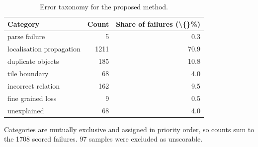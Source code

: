 \begin{table}[t]
\centering
\small
\begin{tabular}{lrr}
\toprule
Category & Count & Share of failures (\textbackslash\{\}\%) \\
\midrule
parse failure & 5 & 0.3 \\
localisation propagation & 1211 & 70.9 \\
duplicate objects & 185 & 10.8 \\
tile boundary & 68 & 4.0 \\
incorrect relation & 162 & 9.5 \\
fine grained loss & 9 & 0.5 \\
unexplained & 68 & 4.0 \\
\bottomrule
\end{tabular}
\vspace{2pt}
\begin{minipage}{\linewidth}\footnotesize Categories are mutually exclusive and assigned in priority order, so counts sum to the 1708 scored failures. 97 samples were excluded as unscorable.\end{minipage}
\caption{Error taxonomy for the proposed method.}
\label{tab:errors}
\end{table}

